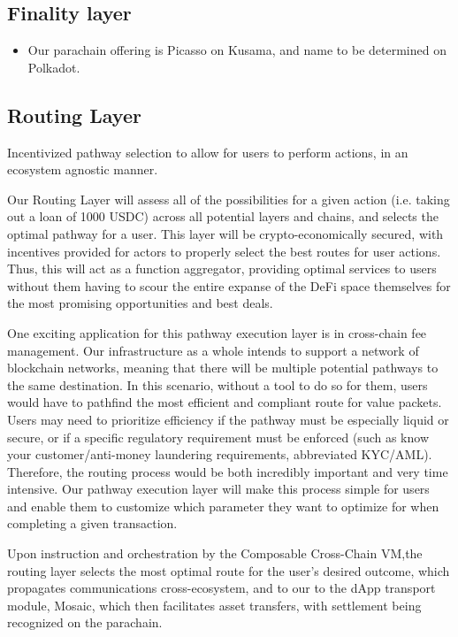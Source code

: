 \subsection{Finality layer}
\begin{itemize}
        \item Our parachain offering is Picasso on Kusama, and name to be determined on Polkadot.
\end{itemize}

\subsection{Routing Layer}

Incentivized pathway selection to allow for users to perform actions, in an ecosystem agnostic manner.

Our Routing Layer will assess all of the possibilities for a given action (i.e. taking out a loan of 1000 USDC) across all potential layers and chains, and selects the optimal pathway for a user. This layer will be crypto-economically secured, with incentives provided for actors to properly select the best routes for user actions. Thus, this will act as a function aggregator, providing optimal services to users without them having to scour the entire expanse of the DeFi space themselves for the most promising opportunities and best deals.

One exciting application for this pathway execution layer is in cross-chain fee management. Our infrastructure as a whole intends to support a network of blockchain networks, meaning that there will be multiple potential pathways to the same destination. In this scenario, without a tool to do so for them, users would have to pathfind the most efficient and compliant route for value packets. Users may need to prioritize efficiency if the pathway must be especially liquid or secure, or if a specific regulatory requirement must be enforced (such as know your customer/anti-money laundering requirements, abbreviated KYC/AML). Therefore, the routing process would be both incredibly important and very time intensive. Our pathway execution layer will make this process simple for users and enable them to customize which parameter they want to optimize for when completing a given transaction.

Upon instruction and orchestration by the Composable Cross-Chain VM,the routing layer selects the most optimal route for the user’s desired outcome, which propagates communications cross-ecosystem, and to our to the dApp transport module, Mosaic, which then facilitates asset transfers, with settlement being recognized on the parachain.

